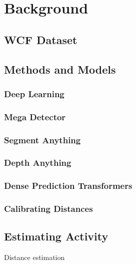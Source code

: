 \section{Background}

\subsection{WCF Dataset}

\subsection{Methods and Models}
\subsubsection{Deep Learning}
\subsubsection{Mega Detector}
\subsubsection{Segment Anything}
\subsubsection{Depth Anything}
\subsubsection{Dense Prediction Transformers}
\subsubsection{Calibrating Distances}

\subsection{Estimating Activity}

Distance estimation~\cite{HAUCKE2022101536}